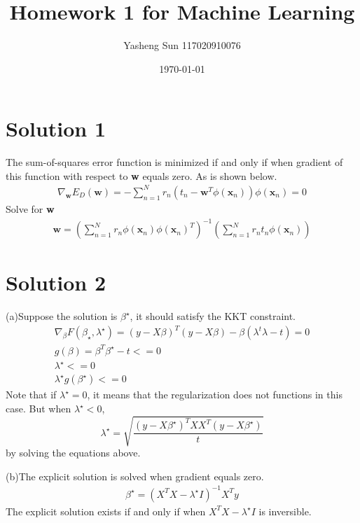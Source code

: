 \documentclass[12pt,a4paper]{ctexart}
\title{Homework 1 for Machine Learning}
\date{\today}
\author{Yasheng Sun 117020910076}
\begin{document}
\begin{flushleft}

\section*{Solution 1}
The sum-of-squares error function is minimized if and only if when gradient of this function with respect to \textbf{w} equals zero. As is shown below.
\begin{eqnarray*}
\nabla_{\textbf{w}} E_{D}(\textbf{w}) = - \sum_{n=1}^{N} r_{n}({t_{n} - \textbf{w}^{T} \phi (\textbf{x}_{n}) })\phi (\textbf{x}_{n}) = 0
\end{eqnarray*}
Solve for \textbf{w}
\begin{eqnarray*}
\textbf{w} = (\sum_{n=1}^{N} r_{n} \phi (\textbf{x}_n) \phi (\textbf{x}_n)^{T} )^{-1}(\sum_{n=1}^{N} r_{n}t_{n} \phi (\textbf{x}_{n}))
\end{eqnarray*}
\section*{Solution 2}
(a)Suppose the solution is $\beta ^{\star}$, it should satisfy the KKT constraint. 
\begin{eqnarray*}
\nabla _{\beta} F(\beta_{\star}, \lambda^{\star}) = (y - X\beta)^{T}(y- X\beta) - \beta (\lambda^{t}\lambda - t)= 0\\
g(\beta) = \beta ^{T} \beta^{\star} - t <= 0\\
\lambda^{\star} <= 0\\
\lambda^{\star} g(\beta^{\star}) <= 0
\end{eqnarray*}
Note that if $\lambda^{\star}=0$, it means that the regularization does not functions in this case. But when $\lambda^{\star}<0$, \[\lambda^{\star} =\sqrt{ \frac{(y- X \beta^{\star})^{T}XX^{T}(y- X \beta^{\star})}{t} }\] by solving the equations above.

(b)The explicit solution is solved when gradient equals zero.
\begin{eqnarray*}
\beta^{\star} = (X^{T} X - \lambda^{\star} I )^{-1} X^{T}y 
\end{eqnarray*}
The explicit solution exists if and only if when $X^{T} X - \lambda^{\star} I $ is inversible.

\end{flushleft}
\end{document}

